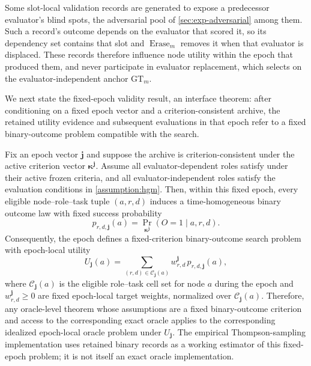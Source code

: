 \begin{remark}
\label{rem:eval-dependent-erase}
Some slot-local validation records are generated to expose a predecessor evaluator's blind spots, the adversarial pool of \cref{sec:exp-adversarial} among them. Such a record's outcome depends on the evaluator that scored it, so its dependency set contains that slot and \(\operatorname{Erase}_m\) removes it when that evaluator is displaced. These records therefore influence node utility within the epoch that produced them, and never participate in evaluator replacement, which selects on the evaluator-independent anchor \(\mathrm{GT}_m\).
\end{remark}

We next state the fixed-epoch validity result, an interface theorem: after conditioning on a fixed epoch vector and a criterion-consistent archive, the retained utility evidence and subsequent evaluations in that epoch refer to a fixed binary-outcome problem compatible with the \hgm search.

\begin{proposition}
\label{prop:validity}
Fix an epoch vector \(\boldsymbol{j}\) and suppose the archive is criterion-consistent under the active
criterion vector \(\boldsymbol{\kappa}^{\boldsymbol{j}}\). Assume all evaluator-dependent roles satisfy
 under their active frozen criteria, and all evaluator-independent roles
satisfy the \hgm evaluation conditions in \cref{assumption:hgm}. Then, within this fixed epoch,
every eligible node--role--task tuple \((a,r,d)\) induces a time-homogeneous binary outcome law
with fixed success probability
\[
p_{r,d,\boldsymbol{j}}(a)
=
\Pr_{\boldsymbol{\kappa}^{\boldsymbol{j}}}\!\left(O=1\mid a,r,d\right).
\]
Consequently, the epoch defines a fixed-criterion binary-outcome search problem with epoch-local
utility
\[
U_{\boldsymbol{j}}(a)
=
\sum_{(r,d)\in\mathcal C_{\boldsymbol{j}}(a)}
w_{r,d}^{\boldsymbol{j}}\,p_{r,d,\boldsymbol{j}}(a),
\]
where \(\mathcal C_{\boldsymbol{j}}(a)\) is the eligible role--task cell set for node \(a\) during the epoch
and \(w_{r,d}^{\boldsymbol{j}}\ge 0\) are fixed epoch-local target weights, normalized over
\(\mathcal C_{\boldsymbol{j}}(a)\). Therefore, any \hgm oracle-level theorem whose assumptions are a
fixed binary-outcome criterion and access to the corresponding exact \cmp oracle applies to the
corresponding idealized epoch-local oracle problem under \(U_{\boldsymbol{j}}\). The empirical
Thompson-sampling implementation uses retained binary records as a working estimator of this
fixed-epoch problem; it is not itself an exact \cmp oracle implementation.
\end{proposition}

